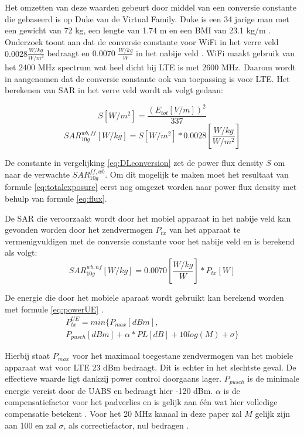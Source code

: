 \documentclass[twocolumn]{phdsymp_dutch}
\begin{document}
Het omzetten van deze waarden gebeurt door middel van een conversie constante die gebaseerd is op 
Duke van de Virtual Family. Duke is een 34 jarige man met een gewicht van 72 kg, een lengte van 1.74 m en 
een BMI van 23.1 kg/m \cite{J22_plets2015joint}. 
Onderzoek toont aan dat de conversie constante voor WiFi in het verre veld $0.0028 \frac{W/kg}{W/m^2}$ bedraagt
en  0.0070 $\frac{W/kg}{W}$ in het nabije veld \cite{J22_plets2015joint}.
WiFi maakt gebruik van het 2400 MHz spectrum wat heel  dicht bij \gls{LTE} is met 2600 MHz. Daarom 
wordt in \cite{J22_plets2015joint} aangenomen dat de conversie  constante ook van toepassing is voor \gls{LTE}.
Het berekenen van \gls{SAR} in het verre veld  wordt als volgt gedaan:

\begin{equation}
S [W/m^2]= \frac{(E_{tot} [V/m])^2}{337}
\label{eq:flux}
\end{equation}
\begin{equation}
SAR^{wb,ff}_{10g} [W/kg]= S [W/m^2]* 0.0028 \left[\frac{W/kg}{W/m^2}\right]
\label{eq:DLconversion}
\end{equation}

De constante in vergelijking \ref{eq:DLconversion} zet de \gls{power flux density} $S$ om  naar de verwachte $SAR^{ff,wb}_{10g}$.
Om dit mogelijk te maken moet 
het resultaat van formule \ref{eq:totalexposure} eerst nog omgezet worden naar \gls{power flux density} met behulp van formule
\ref{eq:flux}.

De \gls{SAR} die veroorzaakt wordt door het mobiel apparaat in het nabije veld kan gevonden worden door 
het zendvermogen $P_{tx}$ van het  apparaat te vermenigvuldigen met de conversie constante voor het nabije veld
en is berekend als volgt:
\begin{equation} 
SAR^{wb,nf}_{10g} [W/kg] = 0.0070 \left[\frac{W/kg}{W}\right] * P_{tx} [W]
\label{eq:ulToSar}
\end{equation}

De energie die door het mobiele aparaat wordt gebruikt kan berekend worden met formule \ref{eq:powerUE} \cite{J22_plets2015joint}.
\begin{multline} 
P_{tx}^{UE} = min \big\{P_{max} [dBm] , \\
 P_{pusch} [dBm] + \alpha * PL [dB] + 10log(M) + \sigma \big\}
\label{eq:powerUE}
\end{multline}


Hierbij staat $P_{max}$ voor het maximaal toegestane zendvermogen van het mobiele apparaat wat voor LTE 23 dBm bedraagt.
Dit is echter in het slechtste geval. De effectieve waarde ligt dankzij power control doorgaans lager.
$P_{pusch}$ is de minimale energie vereist door de 
\gls{UABS} en bedraagt hier -120 dBm. 
$\alpha$ is de compensatiefactor voor het padverlies en is gelijk aan \'e\'en wat hier volledige compensatie betekent \cite{J32,J33}.
Voor het 20 MHz kanaal in deze paper zal $M$ gelijk zijn aan 100 en
 zal $\sigma$,  als correctiefactor, nul bedragen \cite{J22_plets2015joint,J32}.
\end{document}
